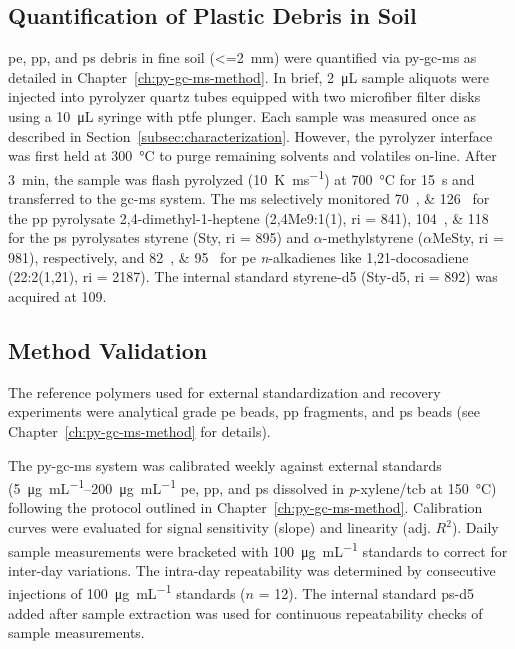 \subsection{Quantification of Plastic Debris in Soil}

\ac{pe}, \ac{pp}, and \ac{ps} debris in fine soil (\SI{<=2}{\milli\meter}) were quantified via \ac{py-gc-ms} as detailed in Chapter~\ref{ch:py-gc-ms-method}.
In brief, \SI{2}{\micro\liter} sample aliquots were injected into pyrolyzer quartz tubes equipped with two microfiber filter disks using a \SI{10}{\micro\liter} syringe with \ac{ptfe} plunger.
Each sample was measured once as described in Section~\ref{subsec:characterization}. However, the pyrolyzer interface was first held at \SI{300}{\degreeCelsius} to purge remaining solvents and volatiles on-line. After \SI{3}{\minute}, the sample was flash pyrolyzed (\SI{10}{\kelvin\per\milli\second}) at \SI{700}{\degreeCelsius} for \SI{15}{\second} and transferred to the \ac{gc-ms} system. The \ac{ms} selectively monitored \SIlist{70;126}{\mz} for the \ac{pp} pyrolysate 2,4-dimethyl-1-heptene (2,4Me9:1(1), \ac{ri} = \num{841}), \SIlist{104;118}{\mz} for the \ac{ps} pyrolysates styrene (Sty, \ac{ri} = \num{895}) and $\alpha$-methylstyrene ($\alpha$MeSty, \ac{ri} = \num{981}), respectively, and \SIlist{82;95}{\mz} for \ac{pe} \textit{n}-alkadienes like 1,21-docosadiene (22:2(1,21), \ac{ri} = \num{2187}). The internal standard styrene-d5 (Sty-d5, \ac{ri} = \num{892}) was acquired at \SI{109}{\mz}.

\subsection{Method Validation}

The reference polymers used for external standardization and recovery experiments were analytical grade \ac{pe} beads, \ac{pp} fragments, and \ac{ps} beads (see Chapter~\ref{ch:py-gc-ms-method} for details).

The \ac{py-gc-ms} system was calibrated weekly against external standards (\SIrange{5}{200}{\micro\gram\per\milli\liter} \ac{pe}, \ac{pp}, and \ac{ps} dissolved in \textit{p}-xylene/\ac{tcb} at \SI{150}{\degreeCelsius}) following the protocol outlined in Chapter~\ref{ch:py-gc-ms-method}. Calibration curves were evaluated for signal sensitivity (slope) and linearity (adj. $R^2$). Daily sample measurements were bracketed with \SI{100}{\micro\gram\per\milli\liter} standards to correct for inter-day variations. The intra-day repeatability was determined by consecutive injections of \SI{100}{\micro\gram\per\milli\liter} standards ($n$ = 12). The internal standard \ac{ps}-d5 added after sample extraction was used for continuous repeatability checks of sample measurements.

